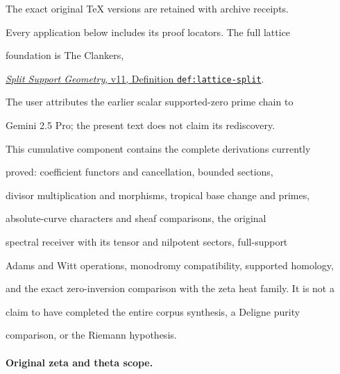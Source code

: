 \documentclass[11pt]{article}
\theoremstyle{definition}
\begin{document}
The exact original TeX versions are retained with archive receipts.



Every application below includes its proof locators. The full lattice



foundation is The Clankers,



\href{https://github.com/KokunoYumeto/zeta-function-research-reader/blob/a2851f9eb352e7e4376bc629de86fa4ed9c1c434/workbenches/splitzero-tandem/foundations/split-support-geometry-v11/split_support_geometry_arithmetic_curve_v11.tex#L1226}{\emph{Split Support Geometry}, v11, Definition \texttt{def:lattice-split}}.



The user attributes the earlier scalar supported-zero prime chain to



Gemini 2.5 Pro; the present text does not claim its rediscovery.



This cumulative component contains the complete derivations currently



proved: coefficient functors and cancellation, bounded sections,



divisor multiplication and morphisms, tropical base change and primes,



absolute-curve characters and sheaf comparisons, the original



spectral receiver with its tensor and nilpotent sectors, full-support



Adams and Witt operations, monodromy compatibility, supported homology,



and the exact zero-inversion comparison with the zeta heat family. It is not a



claim to have completed the entire corpus synthesis, a Deligne purity



comparison, or the Riemann hypothesis.



\paragraph{Original zeta and theta scope.}
\end{document}
